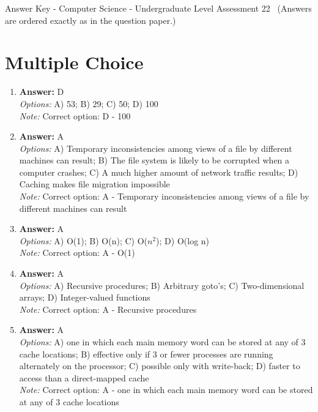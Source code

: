 \documentclass[12pt]{article}
\begin{document}
\begin{center}
Answer Key - Computer Science - Undergraduate Level Assessment 22 \
\small (Answers are ordered exactly as in the question paper.)
\end{center}

\section*{Multiple Choice}
\begin{enumerate}[label=\arabic*.]
\item \textbf{Answer:} D
\\ \textit{Options:} A) 53; B) 29; C) 50; D) 100
\\ \textit{Note:} Correct option: D - 100
\item \textbf{Answer:} A
\\ \textit{Options:} A) Temporary inconsistencies among views of a file by different machines can result; B) The file system is likely to be corrupted when a computer crashes; C) A much higher amount of network traffic results; D) Caching makes file migration impossible
\\ \textit{Note:} Correct option: A - Temporary inconsistencies among views of a file by different machines can result
\item \textbf{Answer:} A
\\ \textit{Options:} A) O(1); B) O(n); C) O($n^2$); D) O(log n)
\\ \textit{Note:} Correct option: A - O(1)
\item \textbf{Answer:} A
\\ \textit{Options:} A) Recursive procedures; B) Arbitrary goto's; C) Two-dimensional arrays; D) Integer-valued functions
\\ \textit{Note:} Correct option: A - Recursive procedures
\item \textbf{Answer:} A
\\ \textit{Options:} A) one in which each main memory word can be stored at any of 3 cache locations; B) effective only if 3 or fewer processes are running alternately on the processor; C) possible only with write-back; D) faster to access than a direct-mapped cache
\\ \textit{Note:} Correct option: A - one in which each main memory word can be stored at any of 3 cache locations
\end{enumerate}
\end{document}
